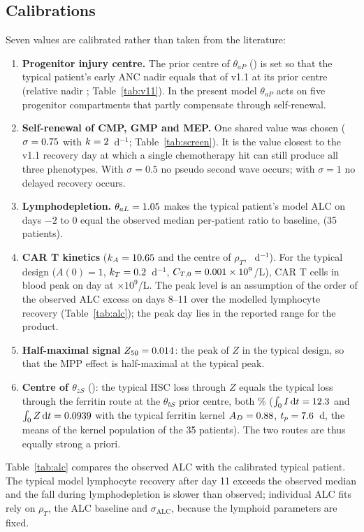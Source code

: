 \documentclass[11pt]{article}
\newcommand{\dd}{\mathrm{d}}
\begin{document}
\subsection{Calibrations}
Seven values are calibrated rather than taken from the literature:
\begin{enumerate}
\item \textbf{Progenitor injury centre.} The prior centre of $\theta_{aP}$ (\valThapCentre) is set so that the typical patient's early ANC nadir equals that of v1.1 at its prior centre (relative nadir \valVOneNadir; Table~\ref{tab:v11}). In the present model $\theta_{aP}$ acts on five progenitor compartments that partly compensate through self-renewal.
\item \textbf{Self-renewal of CMP, GMP and MEP.} One shared value was chosen ($\sigma=0.75$ with $k=2$~d$^{-1}$; Table~\ref{tab:screen}). It is the value closest to the v1.1 recovery day at which a single chemotherapy hit can still produce all three phenotypes. With $\sigma=0.5$ no pseudo second wave occurs; with $\sigma=1$ no delayed recovery occurs.
\item \textbf{Lymphodepletion.} $\theta_{aL}=1.05$ makes the typical patient's model ALC on days $-2$ to 0 equal the observed median per-patient ratio to baseline, \valAlcTarget{} (35 patients).
\item \textbf{CAR T kinetics} ($k_A=10.65$ and the centre of $\rho_T$, \valRhoCentre~d$^{-1}$). For the typical design ($A(0)=1$, $k_T=0.2$~d$^{-1}$, $C_{T,0}=0.001\times10^9$/L), CAR T cells in blood peak on day \valCartPeakDay{} at \valCartPeak{} $\times10^9$/L. The peak level is an assumption of the order of the observed ALC excess on days 8--11 over the modelled lymphocyte recovery (Table~\ref{tab:alc}); the peak day lies in the reported range for the product.
\item \textbf{Half-maximal signal} $Z_{50}=0.014$: the peak of $Z$ in the typical design, so that the MPP effect is half-maximal at the typical peak.
\item \textbf{Centre of $\theta_{zS}$} (\valThzs): the typical HSC loss through $Z$ equals the typical loss through the ferritin route at the $\theta_{bS}$ prior centre, both \valRouteLoss\% ($\int_0 I\,\dd t=\valAucI$ and $\int_0 Z\,\dd t=\valAucZ$ with the typical ferritin kernel $A_D=0.88$, $t_p=7.6$~d, the means of the kernel population of the 35 patients). The two routes are thus equally strong a priori.
\end{enumerate}
Table~\ref{tab:alc} compares the observed ALC with the calibrated typical patient. The typical model lymphocyte recovery after day 11 exceeds the observed median and the fall during lymphodepletion is slower than observed; individual ALC fits rely on $\rho_T$, the ALC baseline and $\sigma_{\mathrm{ALC}}$, because the lymphoid parameters are fixed.
\end{document}
